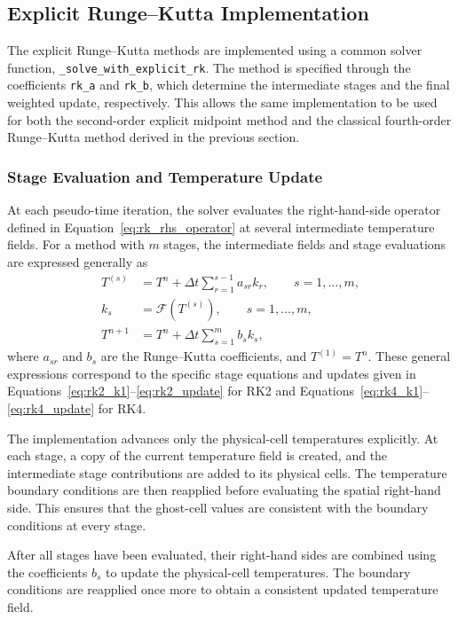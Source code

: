 \subsection{Explicit Runge--Kutta Implementation}
\label{subsec:rk_implementation}

The explicit Runge--Kutta methods are implemented using a
common solver function, \texttt{\_solve\_with\_explicit\_rk}.
The method is specified through the coefficients
\texttt{rk\_a} and \texttt{rk\_b}, which determine the
intermediate stages and the final weighted update,
respectively. This allows the same implementation to be used
for both the second-order explicit midpoint method and the
classical fourth-order Runge--Kutta method derived in the
previous section.

\subsubsection{Stage Evaluation and Temperature Update}

At each pseudo-time iteration, the solver evaluates the
right-hand-side operator defined in
Equation~\eqref{eq:rk_rhs_operator} at several intermediate
temperature fields. For a method with $m$ stages, the
intermediate fields and stage evaluations are expressed
generally as
\begin{align}
T^{(s)}
&=
T^n+\Delta t
\sum_{r=1}^{s-1}a_{sr}k_r,
\qquad s=1,\ldots,m,
\label{eq:rk_implementation_stages}
\\
k_s
&=
\mathcal{F}\left(T^{(s)}\right),
\qquad s=1,\ldots,m,
\label{eq:rk_implementation_rhs}
\\
T^{n+1}
&=
T^n+\Delta t
\sum_{s=1}^{m}b_s k_s,
\label{eq:rk_implementation_update}
\end{align}
where $a_{sr}$ and $b_s$ are the Runge--Kutta coefficients,
and $T^{(1)}=T^n$. These general expressions correspond to
the specific stage equations and updates given in
Equations~\eqref{eq:rk2_k1}--\eqref{eq:rk2_update} for RK2
and Equations~\eqref{eq:rk4_k1}--\eqref{eq:rk4_update}
for RK4.

The implementation advances only the physical-cell
temperatures explicitly. At each stage, a copy of the
current temperature field is created, and the intermediate
stage contributions are added to its physical cells.
The temperature boundary conditions are then reapplied
before evaluating the spatial right-hand side. This ensures
that the ghost-cell values are consistent with the boundary
conditions at every stage.

After all stages have been evaluated, their right-hand sides
are combined using the coefficients $b_s$ to update the
physical-cell temperatures. The boundary conditions are
reapplied once more to obtain a consistent updated
temperature field.

